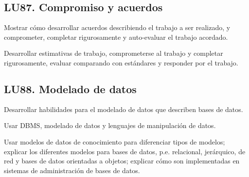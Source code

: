 \subsection{LU87. Compromiso y acuerdos}\label{sec:BOK-LU87}\label{sec:LU87}
\begin{LearningUnit}
\begin{LUGoal}
\item Mostrar cómo desarrollar acuerdos describiendo el trabajo a ser realizado, y comprometer, completar rigurosamente y auto-evaluar el trabajo acordado.
\end{LUGoal}

\begin{LUObjective}
\item Desarrollar estimativas de trabajo, comprometerse al trabajo y completar rigurosamente, evaluar comparando con estándares y responder por el trabajo.
\end{LUObjective}
\end{LearningUnit}

\subsection{LU88. Modelado de datos}\label{sec:BOK-LU88}\label{sec:LU88}
\begin{LearningUnit}
\begin{LUGoal}
\item Desarrollar habilidades para el modelado de datos que describen bases de datos.
\end{LUGoal}

\begin{LUObjective}
\item Usar DBMS, modelado de datos y lenguajes de manipulación de datos.
\item Usar modelos de datos de conocimiento para diferenciar tipos de modelos; explicar los diferentes modelos para bases de datos, p.e. relacional, jerárquico, de red y bases de datos orientadas a objetos; explicar cómo son implementadas en sistemas de administración de bases de datos.
\end{LUObjective}
\end{LearningUnit}

